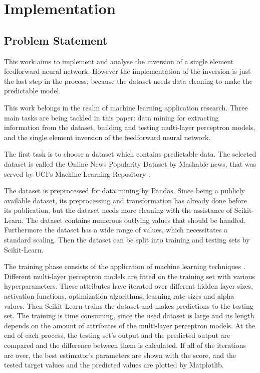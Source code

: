 \chapter{Implementation}

\section{Problem Statement}

This work aims to implement and analyse the inversion of a single element feedforward neural network. However the implementation of the inversion is just the last step in the process, because the dataset needs data cleaning to make the predictable model.\smallskip

This work belongs in the realm of machine learning application research. Three main tasks are being tackled in this paper: data mining for extracting information from the dataset, building and testing multi-layer perceptron models, and the single element inversion of the feedforward neural network. \medskip

The first task is to choose a dataset which contains predictable data. The selected dataset is called the Online News Popularity Dataset by Mashable news, that was served by UCI's Machine Learning Repository \cite{uci-url}. \smallskip

The dataset is preprocessed for data mining by Pandas. Since being a publicly available dataset, its preprocessing and transformation has already done before its publication, but the dataset needs more cleaning with the assistance of Scikit-Learn. The dataset contains numerous outlying values that should be handled. Furthermore the dataset has a wide range of values, which necessitates a standard scaling. Then the dataset can be split into training and testing sets by Scikit-Learn. \medskip

The training phase consists of the application of machine learning techniques \cite{karayiannis2013artificial, jolly2018machine}. Different multi-layer perceptron models are fitted on the training set with various hyperparameters. These attributes have iterated over different hidden layer sizes, activation functions, optimization algorithms, learning rate sizes and alpha values. Then Scikit-Learn trains the dataset and makes predictions to the testing set. The training is time consuming, since the used dataset is large and its length depends on the amount of attributes of the multi-layer perceptron models. At the end of each process, the testing set's output and the predicted output are compared and the difference between them is calculated. If all of the iterations are over, the best estimator's parameters are shown with the score, and the tested target values and the predicted values are plotted by Matplotlib.\medskip

